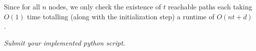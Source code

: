 \documentclass[12pt,twoside]{article}
\begin{document}
\begin{problems}
\begin{problemparts}
Since for all $n$ nodes, we only check the existence of $t$ reachable paths each taking $O(1)$ time totalling (along with the initialization step) a runtime of $O(nt + d)$.

\problempart \emph{Submit your implemented python script.}  %

\end{problemparts}
\end{problems}
\end{document}
